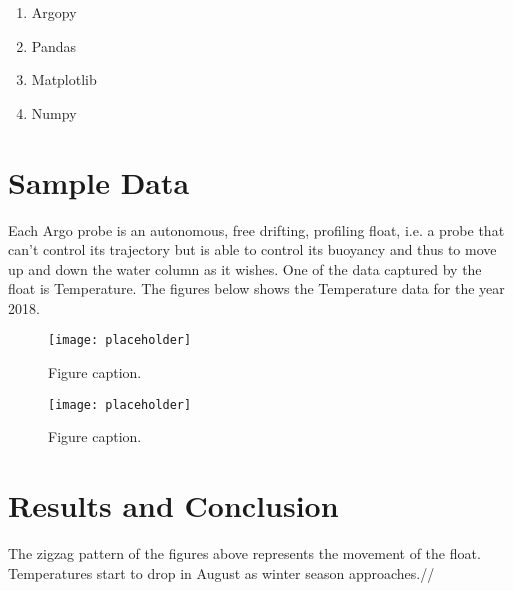 \documentclass[20pt]{report}
\begin{document}
\begin{enumerate}
\item Argopy \\
\item Pandas \\
\item Matplotlib\\
\item Numpy \\
\end{enumerate}


\section{Sample Data}

Each Argo probe is an autonomous, free drifting, profiling float, i.e. a probe that can’t control its trajectory but is able to control its buoyancy and thus to move up and down the water column as it wishes. One of the data captured by the float is Temperature. The figures below shows the Temperature data for the year 2018.

\begin{figure}[h]
\begin{center}
\texttt{[image: placeholder]} %
\caption{Figure caption.}
\end{center}
\end{figure}

\begin{figure}[h]
\begin{center}
\texttt{[image: placeholder]} %
\caption{Figure caption.}
\end{center}
\end{figure}


\section{Results and Conclusion}
The zigzag pattern of the figures above represents the movement of the float. Temperatures start to  drop in August as winter season approaches.//
\end{document}
